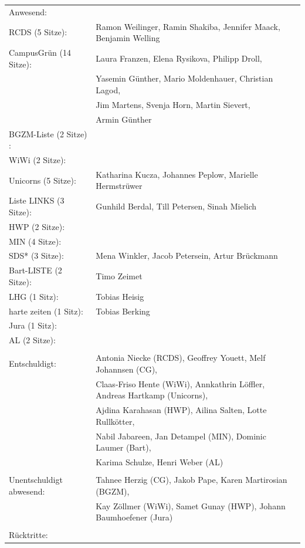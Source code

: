 \documentclass[ngerman,headheight=70pt]{scrartcl}
\begin{document}
    \begin{tabular}{ll}
        Anwesend: & \\
            RCDS (5 Sitze): & Ramon Weilinger, Ramin Shakiba, Jennifer Maack, Benjamin Welling \\
             CampusGrün (14 Sitze): & Laura Franzen, Elena Rysikova, Philipp Droll, \\
                                   & Yasemin Günther, Mario Moldenhauer, Christian Lagod, \\
                                   & Jim Martens, Svenja Horn, Martin Sievert, \\
                                   & Armin Günther \\
             BGZM-Liste (2 Sitze) : & \\
             WiWi (2 Sitze): & \\
             Unicorns (5 Sitze): & Katharina Kucza, Johannes Peplow, Marielle Hermstrüwer \\
             Liste LINKS (3 Sitze): & Gunhild Berdal, Till Petersen, Sinah Mielich \\
             HWP (2 Sitze): &  \\
             MIN (4 Sitze): & \\
             SDS* (3 Sitze): & Mena Winkler, Jacob Petersein, Artur Brückmann \\
             Bart-LISTE (2 Sitze): & Timo Zeimet \\
             LHG (1 Sitz): & Tobias Heisig \\
             harte zeiten (1 Sitz): & Tobias Berking \\
             Jura (1 Sitz): & \\
             AL (2 Sitze): & \\
            & \\
        Entschuldigt: & Antonia Niecke (RCDS), Geoffrey Youett, Melf Johannsen (CG), \\
                      & Claas-Friso Hente (WiWi), Annkathrin Löffler, Andreas Hartkamp (Unicorns), \\
                      & Ajdina Karahasan (HWP), Ailina Salten, Lotte Rullkötter, \\
                      & Nabil Jabareen, Jan Detampel (MIN), Dominic Laumer (Bart), \\
                      & Karima Schulze, Henri Weber (AL) \\
                      &\\
        Unentschuldigt abwesend: & Tahnee Herzig (CG), Jakob Pape, Karen Martirosian (BGZM), \\
                                & Kay Zöllmer (WiWi), Samet Gunay (HWP), Johann Baumhoefener (Jura) \\
                                &\\
        Rücktritte: & \\
    \end{tabular}
\end{document}
